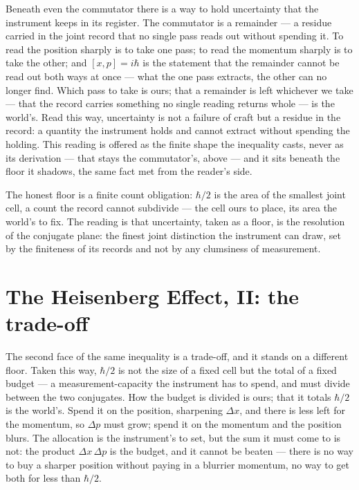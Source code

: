 Beneath even the commutator there is a way to hold uncertainty that the instrument keeps in its register.
The commutator is a remainder --- a residue carried in the joint record that no single pass reads out without
spending it. To read the position sharply is to take one pass; to read the momentum sharply is to take the
other; and $[x,p] = i\hbar$ is the statement that the remainder cannot be read out both ways at once --- what
the one pass extracts, the other can no longer find. Which pass to take is ours; that a remainder is left
whichever we take --- that the record carries something no single reading returns whole --- is the world's.
Read this way, uncertainty is not a failure of craft but a residue in the record: a quantity the instrument
holds and cannot extract without spending the holding. This reading is offered as the finite shape the
inequality casts, never as its derivation --- that stays the commutator's, above --- and it sits beneath the
floor it shadows, the same fact met from the reader's side.

The honest floor is a finite count obligation: $\hbar/2$ is the area of the smallest joint cell, a count the
record cannot subdivide --- the cell ours to place, its area the world's to fix. The reading is that
uncertainty, taken as a floor, is the resolution of the conjugate plane: the finest joint distinction the
instrument can draw, set by the finiteness of its records and not by any clumsiness of measurement.

\section{The Heisenberg Effect, II: the trade-off}
\label{se:heisenberg-tradeoff}

The second face of the same inequality is a trade-off, and it stands on a different floor. Taken this way,
$\hbar/2$ is not the size of a fixed cell but the total of a fixed budget --- a measurement-capacity the
instrument has to spend, and must divide between the two conjugates. How the budget is divided is ours; that
it totals $\hbar/2$ is the world's. Spend it on the position, sharpening $\Delta x$, and there is less left
for the momentum, so $\Delta p$ must grow; spend it on the momentum and the position blurs. The allocation is
the instrument's to set, but the sum it must come to is not: the product $\Delta x\,\Delta p$ is the budget,
and it cannot be beaten --- there is no way to buy a sharper position without paying in a blurrier momentum,
no way to get both for less than $\hbar/2$.

